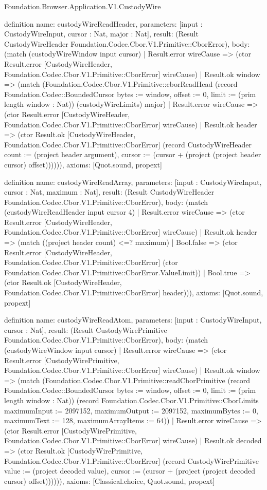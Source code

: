 \begin{lexlean}{Foundation.Browser.Application.V1.CustodyWire}
\begin{semanticmodule}
definition{
  name: custodyWireReadHeader,
  parameters: [input : CustodyWireInput, cursor : Nat, major : Nat],
  result: (Result CustodyWireHeader Foundation.Codec.Cbor.V1.Primitive::CborError),
  body: (match (custodyWireWindow input cursor)
    | Result.error wireCause => (ctor Result.error [CustodyWireHeader, Foundation.Codec.Cbor.V1.Primitive::CborError] wireCause)
    | Result.ok window => (match (Foundation.Codec.Cbor.V1.Primitive::cborReadHead (record Foundation.Codec::BoundedCursor {bytes := window, offset := 0, limit := (prim length window : Nat)}) (custodyWireLimits) major)
      | Result.error wireCause => (ctor Result.error [CustodyWireHeader, Foundation.Codec.Cbor.V1.Primitive::CborError] wireCause)
      | Result.ok header => (ctor Result.ok [CustodyWireHeader, Foundation.Codec.Cbor.V1.Primitive::CborError] (record CustodyWireHeader {count := (project header argument), cursor := (cursor + (project (project header cursor) offset))})))),
  axioms: [Quot.sound, propext]
}

definition{
  name: custodyWireReadArray,
  parameters: [input : CustodyWireInput, cursor : Nat, maximum : Nat],
  result: (Result CustodyWireHeader Foundation.Codec.Cbor.V1.Primitive::CborError),
  body: (match (custodyWireReadHeader input cursor 4)
    | Result.error wireCause => (ctor Result.error [CustodyWireHeader, Foundation.Codec.Cbor.V1.Primitive::CborError] wireCause)
    | Result.ok header => (match ((project header count) <=? maximum)
      | Bool.false => (ctor Result.error [CustodyWireHeader, Foundation.Codec.Cbor.V1.Primitive::CborError] (ctor Foundation.Codec.Cbor.V1.Primitive::CborError.ValueLimit))
      | Bool.true => (ctor Result.ok [CustodyWireHeader, Foundation.Codec.Cbor.V1.Primitive::CborError] header))),
  axioms: [Quot.sound, propext]
}

definition{
  name: custodyWireReadAtom,
  parameters: [input : CustodyWireInput, cursor : Nat],
  result: (Result CustodyWirePrimitive Foundation.Codec.Cbor.V1.Primitive::CborError),
  body: (match (custodyWireWindow input cursor)
    | Result.error wireCause => (ctor Result.error [CustodyWirePrimitive, Foundation.Codec.Cbor.V1.Primitive::CborError] wireCause)
    | Result.ok window => (match (Foundation.Codec.Cbor.V1.Primitive::readCborPrimitive (record Foundation.Codec::BoundedCursor {bytes := window, offset := 0, limit := (prim length window : Nat)}) (record Foundation.Codec.Cbor.V1.Primitive::CborLimits {maximumInput := 2097152, maximumOutput := 2097152, maximumBytes := 0, maximumText := 128, maximumArrayItems := 64}))
      | Result.error wireCause => (ctor Result.error [CustodyWirePrimitive, Foundation.Codec.Cbor.V1.Primitive::CborError] wireCause)
      | Result.ok decoded => (ctor Result.ok [CustodyWirePrimitive, Foundation.Codec.Cbor.V1.Primitive::CborError] (record CustodyWirePrimitive {value := (project decoded value), cursor := (cursor + (project (project decoded cursor) offset))})))),
  axioms: [Classical.choice, Quot.sound, propext]
}


\end{semanticmodule}
\end{lexlean}
